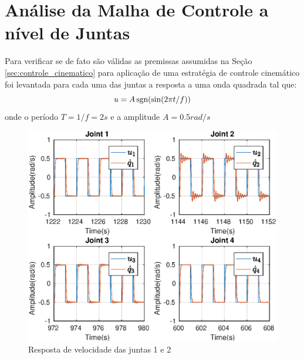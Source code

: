 \section{Análise da Malha de Controle a nível de Juntas}
Para verificar se de fato são válidas as premissas assumidas na Seção \ref{sec:controle_cinematico} para aplicação de uma estratégia de controle cinemático foi levantada para cada uma das juntas a resposta a uma onda quadrada tal que:
\[ u = A \operatorname{sgn}(\sin( 2\pi t/f)) \]
onde o período $T = 1/f = 2s$ e a amplitude $A = 0.5 rad/s$

\newlength{\imageheight}
\begin{figure}[H]
  \centering
    \includegraphics[width=\textwidth, clip=true, trim = 0 0.5\imageheight 0 0 0 mm]{./img/internal_loop}
  \caption{Resposta de velocidade das juntas 1 e 2}
\end{figure}

